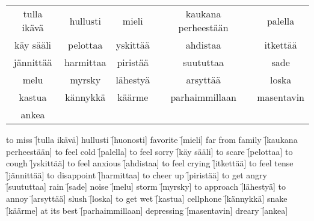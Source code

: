 \begin{center}
  \begin{tabular}{|c c c c c|}
    \hline
    tulla ikävä & hullusti & mieli & kaukana perheestään & palella \\
    käy sääli & pelottaa & yskittää & ahdistaa & itkettää \\
    jännittää & harmittaa & piristää & suututtaa & sade \\
    melu & myrsky & lähestyä & arsyttää & loska \\
    kastua & kännykkä & käärme & parhaimmillaan & masentavin \\
    ankea &&&& \\
    \hline
  \end{tabular}
\end{center}

\begin{questions}
  \begin{multicols}{2}
    \raggedcolumns
    \question to miss  \f[tulla ikävä]
    \question hullusti \f[huonosti]
    \question favorite \f[mieli]
    \question far from family \f[kaukana perheestään]
    \question to feel cold    \f[palella]
    \question to feel sorry   \f[käy sääli]
    \question to scare        \f[pelottaa]
    \question to cough        \f[yskittää]
    \question to feel anxious        \f[ahdistaa]
    \question to feel crying         \f[itkettää]
    \question to feel tense          \f[jännittää]
    \question to disappoint          \f[harmittaa]
    \question to cheer up            \f[piristää]
    \question to get angry           \f[suututtaa]
    \question rain                   \f[sade]
    \question noise                  \f[melu]
    \question storm                  \f[myrsky]
    \question to approach            \f[lähestyä]
    \question to annoy               \f[arsyttää]
    \question slush                  \f[loska]
    \question to get wet             \f[kastua]
    \question cellphone              \f[kännykkä]
    \question snake                  \f[käärme]
    \question at its best            \f[parhaimmillaan]
    \question depressing             \f[masentavin]
    \question dreary                 \f[ankea]
  \end{multicols}
\end{questions}
